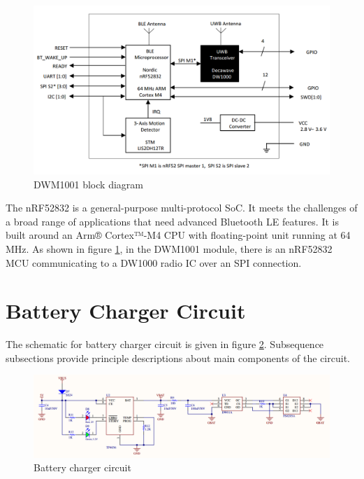 \documentclass[\main/main.tex]{subfiles}
\begin{document}
\begin{figure}[H]
    \begin{center}
        \includegraphics[scale=0.3]{dwm1001_block_diagram.png}
    \end{center}
    \caption{DWM1001 block diagram}
    \label{fig:dwm1001_block_diagram}
\end{figure}

The nRF52832 is a general-purpose multi-protocol SoC. It meets the challenges of a broad range of applications that need advanced Bluetooth LE features. It is built around an Arm® Cortex™-M4 CPU with floating-point unit running at 64 MHz. As shown in figure \ref{fig:dwm1001_block_diagram}, in the DWM1001 module, there is an nRF52832 MCU communicating to  a DW1000 radio IC over an SPI connection.

\section{Battery Charger Circuit}
The schematic for battery charger circuit is given in figure \ref{fig:battery_charger_circuit}. Subsequence subsections provide principle descriptions about main components of the circuit.
\begin{figure}[H]
    \begin{center}
        \includegraphics[width=1\textwidth]{battery_charger_circuit.png}
    \end{center}
    \caption{Battery charger circuit}
    \label{fig:battery_charger_circuit}
\end{figure}
\end{document}
